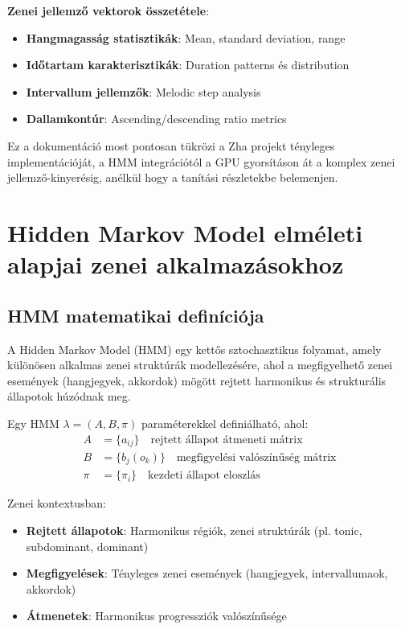 \textbf{Zenei jellemző vektorok összetétele}:
\begin{itemize}
    \item \textbf{Hangmagasság statisztikák}: Mean, standard deviation, range
    \item \textbf{Időtartam karakterisztikák}: Duration patterns és distribution
    \item \textbf{Intervallum jellemzők}: Melodic step analysis
    \item \textbf{Dallamkontúr}: Ascending/descending ratio metrics
\end{itemize}

Ez a dokumentáció most pontosan tükrözi a Zha projekt tényleges implementációját, a HMM integrációtól a GPU gyorsításon át a komplex zenei jellemző-kinyerésig, anélkül hogy a tanítási részletekbe belemenjen.

\section{Hidden Markov Model elméleti alapjai zenei alkalmazásokhoz}

\subsection{HMM matematikai definíciója}

A Hidden Markov Model (HMM) egy kettős sztochasztikus folyamat, amely különösen alkalmas zenei struktúrák modellezésére, ahol a megfigyelhető zenei események (hangjegyek, akkordok) mögött rejtett harmonikus és strukturális állapotok húzódnak meg.

\begin{definition}
Egy HMM $\lambda = (A, B, \pi)$ paraméterekkel definiálható, ahol:
\begin{align}
A &= \{a_{ij}\} \quad \text{rejtett állapot átmeneti mátrix} \\
B &= \{b_j(o_k)\} \quad \text{megfigyelési valószínűség mátrix} \\
\pi &= \{\pi_i\} \quad \text{kezdeti állapot eloszlás}
\end{align}
\end{definition}

Zenei kontextusban:
\begin{itemize}
    \item \textbf{Rejtett állapotok}: Harmonikus régiók, zenei struktúrák (pl. tonic, subdominant, dominant)
    \item \textbf{Megfigyelések}: Tényleges zenei események (hangjegyek, intervallumaok, akkordok)
    \item \textbf{Átmenetek}: Harmonikus progressziók valószínűsége
\end{itemize}

